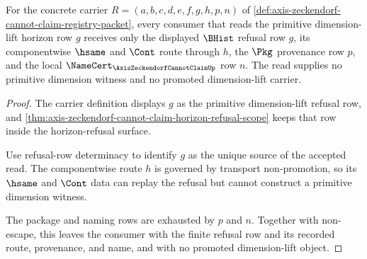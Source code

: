 \begin{theorem}
\label{thm:axis-zeckendorf-dimlift-primitive-refusal-boundary}
For the concrete carrier $R=(a,b,c,d,e,f,g,h,p,n)$ of \autoref{def:axis-zeckendorf-cannot-claim-registry-packet}, every consumer that reads the primitive dimension-lift horizon row $g$ receives only the displayed $\BHist$ refusal row $g$, its componentwise $\hsame$ and $\Cont$ route through $h$, the $\Pkg$ provenance row $p$, and the local $\NameCert_{\AxisZeckendorfCannotClaimUp}$ row $n$. The read supplies no primitive dimension witness and no promoted dimension-lift carrier.
\end{theorem}
\begin{proof}
The carrier definition displays $g$ as the primitive dimension-lift refusal row, and \autoref{thm:axis-zeckendorf-cannot-claim-horizon-refusal-scope} keeps that row inside the horizon-refusal surface.

Use refusal-row determinacy to identify $g$ as the unique source of the accepted read. The componentwise route $h$ is governed by transport non-promotion, so its $\hsame$ and $\Cont$ data can replay the refusal but cannot construct a primitive dimension witness.

The package and naming rows are exhausted by $p$ and $n$. Together with non-escape, this leaves the consumer with the finite refusal row and its recorded route, provenance, and name, and with no promoted dimension-lift object.
\end{proof}

